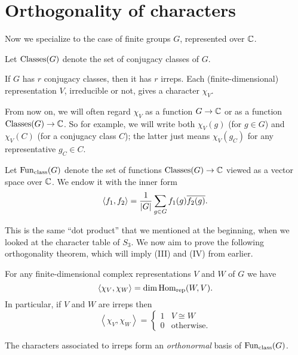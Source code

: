 \section{Orthogonality of characters}
Now we specialize to the case of finite groups $G$, represented over $\mathbb C$.
\begin{definition}
	Let $\operatorname{Classes}(G)$ denote the set of conjugacy classes of $G$.
\end{definition}
If $G$ has $r$ conjugacy classes, then it has $r$ irreps.
Each (finite-dimensional) representation $V$, irreducible or not, gives a
character $\chi_V$.
\begin{abuse}
	From now on, we will often regard $\chi_V$ as a function $G \to \mathbb C$
	or as a function $\operatorname{Classes}(G) \to \mathbb C$.
	So for example, we will write both $\chi_V(g)$ (for $g \in G$)
	and $\chi_V(C)$ (for a conjugacy class $C$);
	the latter just means $\chi_V(g_C)$ for any representative $g_C \in C$.
\end{abuse}
\begin{definition}
	Let $\operatorname{Fun}_{\mathrm{class}}(G)$ denote the set of functions $\operatorname{Classes}(G) \to \mathbb C$
	viewed as a vector space over $\mathbb C$.
	We endow it with the inner form
	\[
		\left< f_1, f_2 \right> =
		\frac{1}{|G|}
		\sum_{g \in G} f_1(g) \overline{f_2(g)}.
	\]
\end{definition}
This is the same ``dot product'' that we mentioned at the beginning,
when we looked at the character table of $S_3$.
We now aim to prove the following orthogonality theorem,
which will imply (III) and (IV) from earlier.
\begin{theorem}[Orthogonality]
	For any finite-dimensional complex representations $V$ and $W$
	of $G$ we have
	\[ \left< \chi_V, \chi_W \right> = \dim \operatorname{Hom}_{\mathrm{rep}}(W, V). \]
	In particular, if $V$ and $W$ are irreps then
	\[ \left< \chi_V, \chi_W \right>
		=
		\begin{cases}
			1 & V  \cong W \\
			0 & \text{otherwise}.
		\end{cases}
	\]
\end{theorem}
\begin{corollary}
	The characters associated to irreps
	form an \emph{orthonormal} basis of $\operatorname{Fun}_{\mathrm{class}}(G)$.
\end{corollary}

